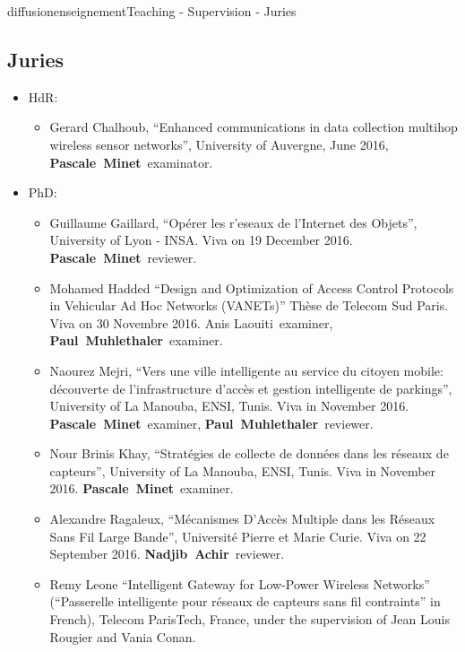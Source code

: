 \documentclass{ra2016}
\newcommand{\paul}             {\textbf{Paul~Muhlethaler}}
\newcommand{\pascale}          {\textbf{Pascale~Minet}}
\newcommand{\achir}            {\textbf{Nadjib~Achir}}
\begin{document}
\begin{module}{diffusion}{enseignement}{Teaching - Supervision - Juries}
\subsection{Juries}

\begin{itemize}
    \item HdR: 
        \begin{itemize}
            \item Gerard Chalhoub, ``Enhanced communications in data collection multihop wireless sensor networks'', University of Auvergne, June 2016, \pascale~examinator.
        \end{itemize} 
    \item PhD: 
        \begin{itemize}
            \item Guillaume Gaillard, ``Op\'erer les r'eseaux de l'Internet des Objets'', University of Lyon - INSA.
                Viva on 19 December 2016.
                \pascale~reviewer. 
            \item Mohamed Hadded  ``Design and Optimization of Access Control Protocols in Vehicular Ad Hoc Networks (VANETs)'' Th\`ese de Telecom Sud Paris.
                Viva on 30 Novembre 2016.
                Anis Laouiti~examiner, \paul~examiner.
            \item Naourez Mejri, ``Vers une ville intelligente au service du citoyen mobile: d\'ecouverte de l'infrastructure d'acc\`es et gestion intelligente de parkings'', University of La Manouba, ENSI, Tunis.
                Viva in November 2016.
                \pascale~examiner, \paul~reviewer.
            \item Nour Brinis Khay, ``Strat\'egies de collecte de donn\'ees dans les r\'eseaux de capteurs'', University of La Manouba, ENSI, Tunis.
                Viva in November 2016.
                \pascale~examiner.
            \item Alexandre Ragaleux, ``M\'ecanismes D'Acc\`es Multiple dans les R\'eseaux Sans Fil Large Bande'', Université Pierre et Marie Curie.
                Viva on 22 September 2016.
                \achir~reviewer.  
            \item Remy Leone ``Intelligent Gateway for Low-Power Wireless Networks'' (``Passerelle intelligente pour réseaux de capteurs sans fil contraints'' in French), Telecom ParisTech, France, under the supervision of Jean Louis Rougier and Vania Conan.

\end{itemize}
\end{itemize}
\end{module}
\end{document}
